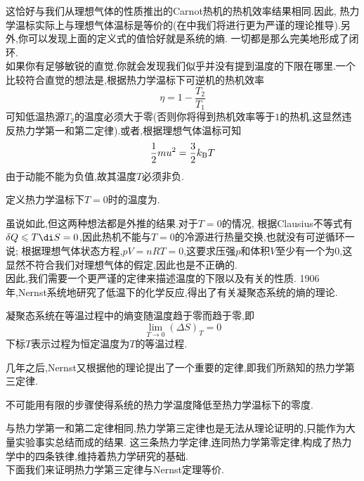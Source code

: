 \documentclass{ctexart}
\begin{document}
这恰好与我们从理想气体的性质推出的Carnot热机的热机效率结果相同.因此,%
热力学温标实际上与理想气体温标是等价的(在中我们将进行更为严谨的理论推导).另外,你可以发现上面的定义式的值恰好就是系统的熵.%
一切都是那么完美地形成了闭环.\vspace{12pt}\\
\indent 如果你有足够敏锐的直觉,你就会发现我们似乎并没有提到温度的下限在哪里.一个比较符合直觉的想法是,根据热力学温标下可逆机的热机效率
\[\eta=1-\dfrac{T_2}{T_1}\]
可知低温热源$T_2$的温度必须大于零(否则你将得到热机效率等于$1$的热机,这显然违反热力学第一和第二定律).或者,根据理想气体温标可知
\[\dfrac12mu^2=\dfrac{3}{2}k_\text BT\]
由于动能不能为负值,故其温度$T$必须非负.
\begin{definition}[3D.2.1 绝对零度]
    定义热力学温标下$T=0$时的温度为.
\end{definition}
虽说如此,但这两种想法都是外推的结果.对于$T=0$的情况,%
根据Clausius不等式有$\delta Q\leqslant T\di S=0$,因此热机不能与$T=0$的冷源进行热量交换,也就没有可逆循环一说;%
根据理想气体状态方程,$pV=nRT=0$,这要求压强$p$和体积$V$至少有一个为$0$,这显然不符合我们对理想气体的假定,因此也是不正确的.\\
\indent 因此,我们需要一个更严谨的定律来描述温度的下限以及有关的性质.%
1906年,Nernst系统地研究了低温下的化学反应,得出了有关凝聚态系统的熵的理论.
\begin{theorem}[3D.2.1 Nernst定理]
    凝聚态系统在等温过程中的熵变随温度趋于零而趋于零,即
    \[\lim_{T\to0}\left(\Delta S\right)_T=0\]
    下标$T$表示过程为恒定温度为$T$的等温过程.
\end{theorem}
几年之后,Nernst又根据他的理论提出了一个重要的定律,即我们所熟知的热力学第三定律.
\begin{theorem}[3D.2.2 热力学第三定律]
    不可能用有限的步骤使得系统的热力学温度降低至热力学温标下的零度.
\end{theorem}
与热力学第一和第二定律相同,热力学第三定律也是无法从理论证明的,只能作为大量实验事实总结而成的结果.%
这三条热力学定律,连同热力学第零定律,构成了热力学中的四条铁律,维持着热力学研究的基础.\\
\indent 下面我们来证明热力学第三定律与Nernst定理等价.
\end{document}
